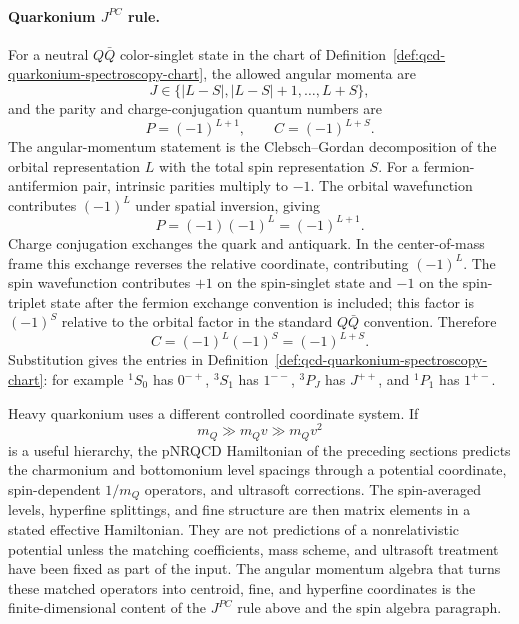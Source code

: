 \paragraph{Quarkonium \(J^{PC}\) rule.}
For a neutral \(Q\bar Q\) color-singlet state in the chart of
Definition~\ref{def:qcd-quarkonium-spectroscopy-chart}, the allowed angular
momenta are
\[
  J\in\{|L-S|,|L-S|+1,\ldots,L+S\},
\]
and the parity and charge-conjugation quantum numbers are
\begin{equation}
  P=(-1)^{L+1},
  \qquad
  C=(-1)^{L+S}.
  \label{eq:qcd-quarkonium-pc-rule}
\end{equation}
The angular-momentum statement is the Clebsch--Gordan decomposition of the
orbital representation \(L\) with the total spin representation \(S\).  For a
fermion-antifermion pair, intrinsic parities multiply to \(-1\).  The orbital
wavefunction contributes \((-1)^L\) under spatial inversion, giving
\[
  P=(-1)(-1)^L=(-1)^{L+1}.
\]
Charge conjugation exchanges the quark and antiquark.  In the center-of-mass
frame this exchange reverses the relative coordinate, contributing
\((-1)^L\).  The spin wavefunction contributes \(+1\) on the spin-singlet
state and \(-1\) on the spin-triplet state after the fermion exchange
convention is included; this factor is \((-1)^S\) relative to the orbital
factor in the standard \(Q\bar Q\) convention.  Therefore
\[
  C=(-1)^L(-1)^S=(-1)^{L+S}.
\]
Substitution gives the entries in
Definition~\ref{def:qcd-quarkonium-spectroscopy-chart}: for example
\({}^1S_0\) has \(0^{-+}\), \({}^3S_1\) has \(1^{--}\),
\({}^3P_J\) has \(J^{++}\), and \({}^1P_1\) has \(1^{+-}\).

Heavy quarkonium uses a different controlled coordinate system.  If
\[
  m_Q\gg m_Qv\gg m_Qv^2
\]
is a useful hierarchy, the pNRQCD Hamiltonian of the preceding sections
predicts the charmonium and bottomonium level spacings through a potential
coordinate, spin-dependent \(1/m_Q\) operators, and ultrasoft corrections.
The spin-averaged levels, hyperfine splittings, and fine structure are then
matrix elements in a stated effective Hamiltonian.  They are not predictions
of a nonrelativistic potential unless the matching coefficients, mass scheme,
and ultrasoft treatment have been fixed as part of the input.  The angular
momentum algebra that turns these matched operators into centroid, fine, and
hyperfine coordinates is the finite-dimensional content of the \(J^{PC}\)
rule above and the spin algebra paragraph.

